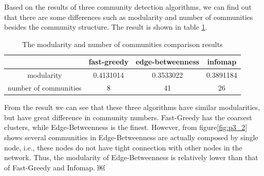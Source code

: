 \documentclass{article}
\begin{document}
\noindent Based on the results of three community detection algorithms, we can find out that there are some differences such as modularity and number of communities besides the community structure. The result is shown in table \ref{tb:p3}.
\begin {table}[htbp]
\caption{The modularity and number of communities comparison results}
\begin{adjustbox}{center}
\label{tb:p3}
\begin{tabular}{|c|c|c|c|}
\hline
&fast-greedy &edge-betweenness &infomap\\
\hline
modularity&0.4131014&0.3533022&0.3891184\\
\hline
number of communities&8&41 & 26\\
\hline
\end{tabular}
\end{adjustbox}
\end{table}
From the result we can see that these three algorithms have similar modularities, but have great difference in community numbers. Fast-Greedy has the coarsest clusters, while Edge-Betweenness is the finest. However, from figure\ref{fig:p3_2} shows several communities in Edge-Betweenness are actually composed by single node, i.e., these nodes do not have tight connection with other nodes in the network. Thus, the modularity of Edge-Betweenness is relatively lower than that of Fast-Greedy and Infomap.
￼
\end{document}
